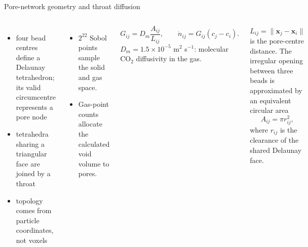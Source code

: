 \begin{frame}{Pore-network geometry and throat diffusion}
\setlength{\abovedisplayskip}{5pt}\setlength{\belowdisplayskip}{5pt}
  \begin{columns}[T,onlytextwidth]
      \footnotesize
      \begin{itemize}\setlength{\itemsep}{1pt}\setlength{\parskip}{0pt}
        \item four bead centres define a Delaunay tetrahedron; its valid circumcentre represents a pore node
        \item tetrahedra sharing a triangular face are joined by a throat
        \item topology comes from particle coordinates, not voxels
      \end{itemize}
      \vspace{0.12cm}
      \begin{itemize}\setlength{\itemsep}{1pt}\setlength{\parskip}{0pt}
        \item $2^{22}$ Sobol points sample the solid and gas space.
        \item Gas-point counts allocate the calculated void volume to pores.
      \end{itemize}
      \[
        G_{ij}=D_m\frac{A_{ij}}{L_{ij}},\qquad
        \dot n_{ij}=G_{ij}(c_j-c_i).
      \]
      \footnotesize
      $D_m=1.5\times10^{-5}$ m$^2$ s$^{-1}$: molecular CO$_2$ diffusivity in the gas.
      \par\smallskip
      $L_{ij}=\lVert\mathbf{x}_j-\mathbf{x}_i\rVert$ is the pore-centre distance.
      The irregular opening between three beads is approximated by an equivalent
      circular area
      \[
        A_{ij}=\pi r_{ij}^{2},
      \]
      where $r_{ij}$ is the clearance of the shared Delaunay face.
  \end{columns}
  \vspace{0.16cm}
\end{frame}

